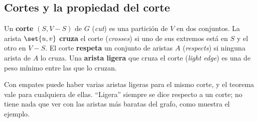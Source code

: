 \documentclass[11pt,letterpaper]{article}
\begin{document}

\subsection*{Cortes y la propiedad del corte}

\begin{definicion}
  \label{def:corte-mst}
  Un \textbf{corte} $(S, V - S)$ de $G$ (\textit{cut}) es una partición
  de $V$ en dos conjuntos. La arista $\set{u, v}$ \textbf{cruza} el
  corte (\textit{crosses}) si uno de sus extremos está en $S$ y el otro
  en $V - S$. El corte \textbf{respeta} un conjunto de aristas $A$
  (\textit{respects}) si ninguna arista de $A$ lo cruza. Una
  \textbf{arista ligera} que cruza el corte (\textit{light edge}) es
  una de peso mínimo entre las que lo cruzan.
\end{definicion}

Con empates puede haber varias aristas ligeras para el mismo corte, y
el teorema vale para cualquiera de ellas. ``Ligera'' siempre se dice
respecto a un corte; no tiene nada que ver con las aristas más baratas
del grafo, como muestra el ejemplo.
\end{document}
